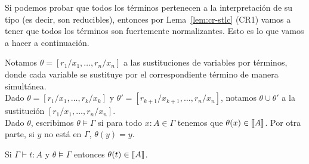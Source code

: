 Si podemos probar que todos los términos pertenecen a la interpretación de su tipo (es decir, son reducibles), entonces por Lema~\ref{lem:cr-stlc} (CR1) vamos a tener que todos los términos son fuertemente normalizantes. Esto es lo que vamos a hacer a continuación.

\begin{definition}
  Notamos \( \theta = [r_1/x_1, \ldots, r_n/x_n] \) a las sustituciones de variables por términos, donde cada variable se sustituye por el correspondiente término de manera simultánea.\\
  Dado \( \theta = [r_1/x_1, \ldots, r_k/x_k] \) y \( \theta' = [r_{k + 1}/x_{k + 1}, \ldots, r_n/x_n] \), notamos \( \theta \cup \theta' \) a la sustitución \( [r_1/x_1, \ldots, r_n/x_n] \).\\
  Dado \( \theta \), escribimos \( \theta \models \Gamma \) si para todo \( x : A \in \Gamma \) tenemos que \( \theta(x) \in \llbracket A\rrbracket \). Por otra parte, si \( y \) no está en \( \Gamma \), \( \theta(y) = y \).
\end{definition}

\begin{lemma}[Adecuación]\label{lem:adequacy-stlc}
  Si \( \Gamma \vdash t:A \) y \( \theta \models \Gamma \) entonces \( \theta(t) \in \llbracket A\rrbracket \).
\end{lemma}

